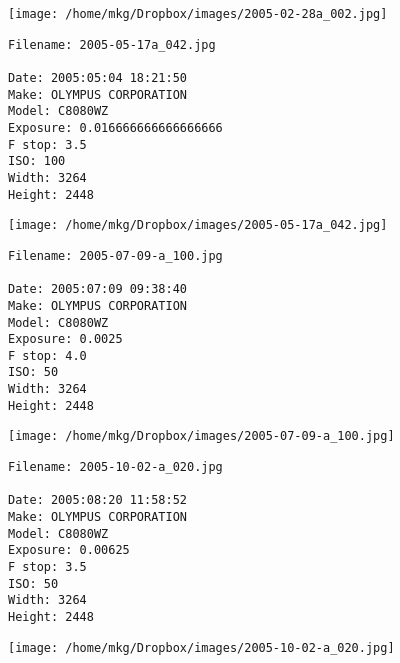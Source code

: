 \begin{landscape}

\texttt{[image: /home/mkg/Dropbox/images/2005-02-28a\_002.jpg]}
\end{landscape}



\noindent 
\begin{lstlisting}
Filename: 2005-05-17a_042.jpg

Date: 2005:05:04 18:21:50
Make: OLYMPUS CORPORATION
Model: C8080WZ
Exposure: 0.016666666666666666
F stop: 3.5
ISO: 100
Width: 3264
Height: 2448
\end{lstlisting}

\begin{landscape}

\texttt{[image: /home/mkg/Dropbox/images/2005-05-17a\_042.jpg]}
\end{landscape}



\noindent 
\begin{lstlisting}
Filename: 2005-07-09-a_100.jpg

Date: 2005:07:09 09:38:40
Make: OLYMPUS CORPORATION
Model: C8080WZ
Exposure: 0.0025
F stop: 4.0
ISO: 50
Width: 3264
Height: 2448
\end{lstlisting}

\begin{landscape}

\texttt{[image: /home/mkg/Dropbox/images/2005-07-09-a\_100.jpg]}
\end{landscape}



\noindent 
\begin{lstlisting}
Filename: 2005-10-02-a_020.jpg

Date: 2005:08:20 11:58:52
Make: OLYMPUS CORPORATION
Model: C8080WZ
Exposure: 0.00625
F stop: 3.5
ISO: 50
Width: 3264
Height: 2448
\end{lstlisting}

\begin{landscape}

\texttt{[image: /home/mkg/Dropbox/images/2005-10-02-a\_020.jpg]}
\end{landscape}



